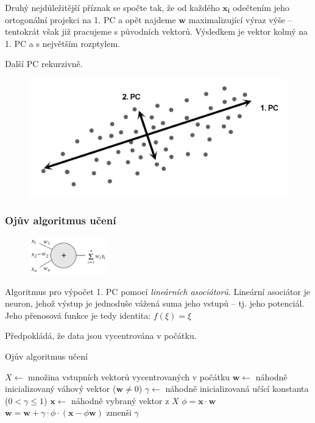 \documentclass[11pt]{report} %
\renewcommand{\vec}[1]{\mathbf{#1}}
\numberwithin{equation}{section}
\begin{document}
Druhý nejdůležitější příznak se spočte tak, že od každého $\vec{x_i}$ odečtením jeho ortogonální projekci na 1. PC a opět najdeme $\vec{w}$ maximalizující výraz výše -- tentokrát však již pracujeme s  původních vektorů. Výsledkem je vektor kolmý na 1. PC a s největším rozptylem. 

Další PC rekurzivně.

\begin{figure}[h]
	\centering
	\includegraphics[]{img/pca.png}
\end{figure}

\subsubsection{Ojův algoritmus učení}
\begin{figure}
	\centering
	\includegraphics[width=0.3\textwidth]{img/lin_asoc.png}
\end{figure}
Algoritmus pro výpočet 1. PC pomocí \textit{lineárních asociátorů}. Lineární asociátor je neuron, jehož výstup je jednoduše vážená suma jeho vstupů -- tj. jeho potenciál. Jeho přenosová funkce je tedy identita: $f(\xi) = \xi$

Předpokládá, že data jsou vycentrována v počátku.

\bigskip
\begin{algorithm}[H]
\caption{Ojův algoritmus učení}
\begin{algorithmic}[1]
	\State $X \gets$  množina vstupních vektorů vycentrovaných v počátku
	\State $\vec{w} \gets$ náhodně inicializovaný váhový vektor ($\vec{w} \neq 0$)
	\State $\gamma \gets $ náhodně inicializovaná učící konstanta ($0 < \gamma \leq 1$)
		\State $\vec{x} \gets$ náhodně vybraný vektor z $X$
		\State $\phi = \vec{x}\cdot \vec{w}$
		\State $\vec{w} = \vec{w} + \gamma\cdot\phi\cdot(\vec{x} - \phi\vec{w})$
		\State zmenši $\gamma$
	\EndWhile
\end{algorithmic}
\end{algorithm}				
\end{document}

